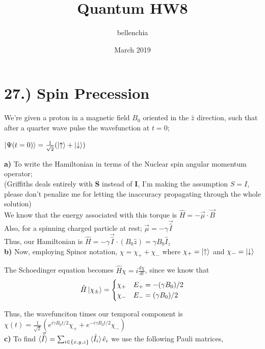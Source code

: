 \documentclass[12pt]{article}
\title{Quantum HW8}
\author{bellenchia}
\date{March 2019}
\begin{document}
\maketitle

\section*{27.) Spin Precession}
We're given a proton in a magnetic field $B_0$ oriented in the $\hat{z}$ direction, such that after a quarter wave pulse the wavefunction at $t=0$;\\
\begin{center}
$\ket{\Psi(t=0)}=\frac{1}{\sqrt{2}}(\ket{\uparrow}+\ket{\downarrow})$\\
\end{center}

\textbf{a)} To write the Hamiltonian in terms of the Nuclear spin angular momentum operator;\\
(Griffiths deals entirely with \textbf{S} instead of \textbf{I}, I'm making the assumption $S= I$, please don't penalize me for letting the inaccuracy propagating through the whole solution)\\

We know that the energy associated with this torque is $\hat{H}=-\vec{\mu}\cdot\vec{B}$ \\
Also, for a spinning charged particle at rest; $\vec{\mu}=-\gamma\vec{\hat{I}}$\\

Thus, our Hamiltonian is $\hat{H}=-\gamma \vec{\hat{I}}\cdot(B_0\hat{z})=\gamma  B_0\hat{I}_z$\\

\textbf{b)} Now, employing Spinor notation, $\chi=\chi_++\chi_-$ where $\chi_+=\ket{\uparrow}$ and $\chi_-=\ket{\downarrow}$

The Schoedinger equation becomes $\hat{H}\chi=i \frac{d\chi}{dt}$, since we know that\\
\[
\hat{H}\ket{\chi_\pm}=
\begin{cases}
\chi_+ & E_+=-(\gamma B_0 )/2\\
\chi_- & E_-=(\gamma B_0 )/2
\end{cases}
\]

Thus, the wavefunciton times our temporal component is   $\chi(t)=\frac{1}{\sqrt{2}}(e^{i\gamma B_0t/2}\chi_++e^{-i\gamma B_0t/2}\chi_-)$\\
\textbf{c)} To find $\braket{\vec{\hat{I}}}=\sum_{i\in\{x,y,z\}}\braket{\hat{I}_i}\hat{e}_i$ we use the following Pauli matrices,\\
\end{document}
